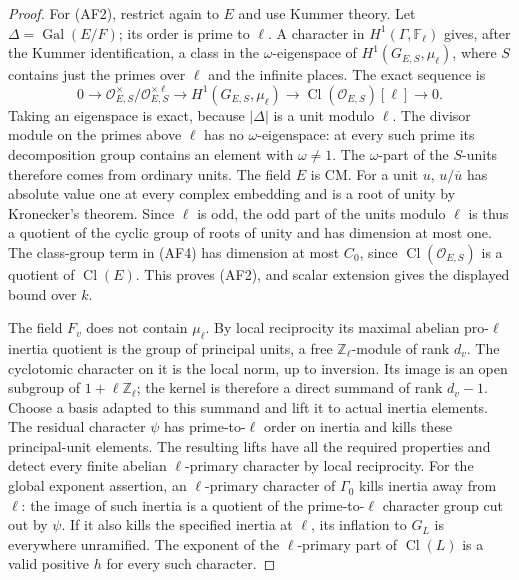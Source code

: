 \begin{proof}
For (AF2), restrict again to $E$ and use Kummer theory.
Let $\Delta=\operatorname{Gal}(E/F)$; its order is prime
to $\ell$.  A character in $H^1(\Gamma,\mathbb F_\ell)$
gives, after the Kummer identification, a class in the
$\omega$-eigenspace of
$H^1(G_{E,S},\mu_\ell)$, where $S$ contains just the primes
over $\ell$ and the infinite places.  The exact sequence is
\[
 0\longrightarrow\mathcal O_{E,S}^{\times}/
                     \mathcal O_{E,S}^{\times\ell}
 \longrightarrow H^1(G_{E,S},\mu_\ell)
 \longrightarrow\operatorname{Cl}(\mathcal O_{E,S})[\ell]
 \longrightarrow0.                                      \tag{AF4}
\]
Taking an eigenspace is exact, because $|\Delta|$ is a unit
modulo $\ell$.  The divisor module on the primes above
$\ell$ has no $\omega$-eigenspace: at every such prime its
decomposition group contains an element with $\omega\ne1$.
The $\omega$-part of the $S$-units therefore comes from
ordinary units.  The field $E$ is CM.  For a unit $u$,
$u/\overline u$ has absolute value one at every complex
embedding and is a root of unity by Kronecker's theorem.
Since $\ell$ is odd, the odd part of the units modulo
$\ell$ is thus a quotient of the cyclic group of roots
of unity and has dimension at most one.  The class-group
term in (AF4) has dimension at most $C_0$, since
$\operatorname{Cl}(\mathcal O_{E,S})$ is a quotient of
$\operatorname{Cl}(E)$.  This proves (AF2), and scalar
extension gives the displayed bound over $k$.

The field $F_v$ does not contain $\mu_\ell$.  By local
reciprocity its maximal abelian pro-$\ell$ inertia
quotient is the group of principal units, a free
$\mathbb Z_\ell$-module of rank $d_v$.  The cyclotomic
character on it is the local norm, up to inversion.  Its
image is an open subgroup of $1+\ell\mathbb Z_\ell$;
the kernel is therefore a direct summand of rank $d_v-1$.
Choose a basis adapted to this summand and lift it to
actual inertia elements.  The residual character $\psi$
has prime-to-$\ell$ order on inertia and kills these
principal-unit elements.  The resulting lifts have all
the required properties and detect every finite abelian
$\ell$-primary character by local reciprocity.
For the global exponent assertion, an $\ell$-primary
character of $\Gamma_0$ kills inertia away from $\ell$:
the image of such inertia is a quotient of the
prime-to-$\ell$ character group cut out by $\psi$.
If it also kills the specified inertia at $\ell$, its
inflation to $G_L$ is everywhere unramified.  The exponent
of the $\ell$-primary part of $\operatorname{Cl}(L)$ is a
valid positive $h$ for every such character.


\end{proof}
